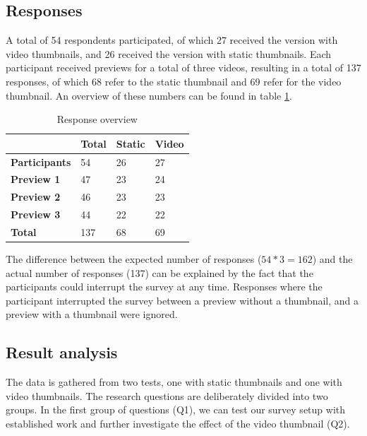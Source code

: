 \documentclass{../resources/sig-alternate-05-2015}
\begin{document}
\subsection{Responses}

A total of 54 respondents participated, of which 27 received the version with video thumbnails, and 26 received the version with static thumbnails. Each participant received previews for a total of three videos, resulting in a total of 137 responses, of which 68 refer to the static thumbnail and 69 refer for the video thumbnail. An overview of these numbers can be found in table \ref{table: number of responses table}.

\begin{table}[h]
\centering
\caption{Response overview}
\label{table: number of responses table}
\begin{tabular}{@{}llll@{}}
\textbf{}             & \textbf{Total} & \textbf{Static} & \textbf{Video} \\ \toprule
\textbf{Participants} & 54             & 26              & 27             \\ \midrule
\textbf{Preview 1}    & 47             & 23              & 24             \\
\textbf{Preview 2}    & 46             & 23              & 23             \\
\textbf{Preview 3}    & 44             & 22              & 22             \\ \bottomrule
\textbf{Total}        & 137            & 68              & 69             \\
\end{tabular}
\end{table}

The difference between the expected number of responses ($54 * 3 = 162$) and the actual number of responses (137) can be explained by the fact that the participants could interrupt the survey at any time. Responses where the participant interrupted the survey between a preview without a thumbnail, and a preview with a thumbnail were ignored.

\subsection{Result analysis}

The data is gathered from two tests, one with static thumbnails and one with video thumbnails. The research questions are deliberately divided into two groups. In the first group of questions (Q1), we can test our survey setup with established work and further investigate the effect of the video thumbnail (Q2).
\end{document}
